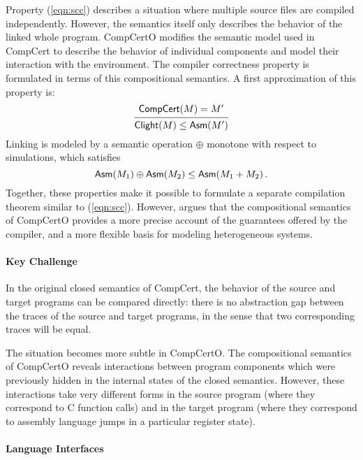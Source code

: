 \documentclass[sigplan,10pt,authordraft]{acmart}
\begin{document}
Property (\ref{eqn:scc})
describes a situation where
multiple source files are compiled independently.
However,
the semantics itself
only describes the behavior of the linked whole program.
CompCertO modifies the semantic model used in CompCert
to describe the behavior of individual components
and model their interaction with the environment.
The compiler correctness property
is formulated in terms of this compositional semantics.
A first approximation of this property is:
\begin{equation} \label{eqn:ccc}
  \begin{prooftree}
    \hypo{\kw{CompCert}(M) = M'}
    \infer1{\kw{Clight}(M) \le \kw{Asm}(M')}
  \end{prooftree}
\end{equation}
Linking is modeled by a semantic operation $\oplus$
monotone with respect to simulations,
which satisfies
\[
   \mathsf{Asm} (M_1) \oplus  \mathsf{Asm} (M_2) \le
   \mathsf{Asm} (M_1 + M_2)
  \,.
\]
Together,
these properties make it possible to formulate
a separate compilation theorem
similar to (\ref{eqn:scc}).
However,
\citet{compcerto} argues that
the compositional semantics of CompCertO
provides a more precise account 
of the guarantees offered by the compiler,
and a more flexible basis
for modeling heterogeneous systems.


\paragraph{Key Challenge} %

In the original closed semantics of CompCert,
the behavior of the source and target programs
can be compared directly:
there is no abstraction gap between the traces
of the source and target programs,
in the sense that
two corresponding traces will be equal.

The situation becomes more subtle in CompCertO.
The compositional semantics of CompCertO
reveals interactions between program components
which were previously hidden in the internal states
of the closed semantics.
However,
these interactions take very different forms
in the source program
(where they correspond to C function calls)
and in the target program
(where they correspond to assembly language jumps
in a particular register state).


\paragraph{Language Interfaces} %
\end{document}
